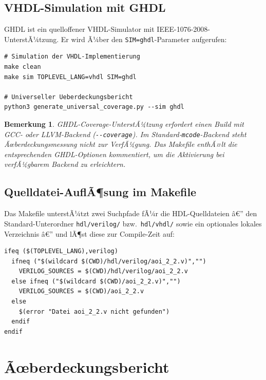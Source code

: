 ﻿\documentclass[12pt,a4paper]{report}
\newtheorem{bemerkung}[theorem]{Bemerkung}
\begin{document}
\subsection{VHDL-Simulation mit GHDL}

GHDL ist ein quelloffener VHDL-Simulator mit IEEE-1076-2008-UnterstÃ¼tzung.
Er wird Ã¼ber den \texttt{SIM=ghdl}-Parameter aufgerufen:

\begin{lstlisting}[style=bashstyle, caption={VHDL-Simulation mit GHDL}]
# Simulation der VHDL-Implementierung
make clean
make sim TOPLEVEL_LANG=vhdl SIM=ghdl

# Universeller Ueberdeckungsbericht
python3 generate_universal_coverage.py --sim ghdl
\end{lstlisting}

\begin{bemerkung}
GHDL-Coverage-UnterstÃ¼tzung erfordert einen Build mit GCC- oder LLVM-Backend
(\texttt{-{}-coverage}). Im Standard-\texttt{mcode}-Backend steht
Ãœberdeckungsmessung nicht zur VerfÃ¼gung. Das Makefile enthÃ¤lt die
entsprechenden GHDL-Optionen kommentiert, um die Aktivierung bei verfÃ¼gbarem
Backend zu erleichtern.
\end{bemerkung}

\subsection{Quelldatei-AuflÃ¶sung im Makefile}

Das Makefile unterstÃ¼tzt zwei Suchpfade fÃ¼r die HDL-Quelldateien â€” den
Standard-Unterordner \texttt{hdl/verilog/} bzw.\ \texttt{hdl/vhdl/} sowie
ein optionales lokales Verzeichnis â€” und lÃ¶st diese zur Compile-Zeit auf:

\begin{lstlisting}[style=bashstyle, caption={Robuste Quelldatei-Suche im Makefile}]
ifeq ($(TOPLEVEL_LANG),verilog)
  ifneq ("$(wildcard $(CWD)/hdl/verilog/aoi_2_2.v)","")
    VERILOG_SOURCES = $(CWD)/hdl/verilog/aoi_2_2.v
  else ifneq ("$(wildcard $(CWD)/aoi_2_2.v)","")
    VERILOG_SOURCES = $(CWD)/aoi_2_2.v
  else
    $(error "Datei aoi_2_2.v nicht gefunden")
  endif
endif
\end{lstlisting}

\section{Ãœberdeckungsbericht}
\label{subsec:coverage_report}
\end{document}
